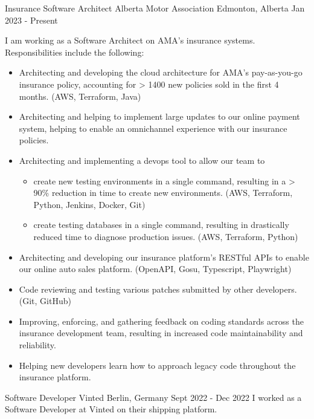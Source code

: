
\begin{cventries}
    \cventry
        {Insurance Software Architect}
        {Alberta Motor Association}
        {Edmonton, Alberta}
        {Jan 2023 - Present}
        {
            I am working as a Software Architect on AMA's insurance systems.  Responsibilities include the following:
            \begin{itemize}
                \item Architecting and developing the cloud architecture for AMA's pay-as-you-go insurance policy, accounting for > 1400 new policies sold in the first 4 months. (AWS, Terraform, Java)
                \item Architecting and helping to implement large updates to our online payment system, helping to enable an omnichannel experience with our insurance policies.
                \item Architecting and implementing a devops tool to allow our team to
                \begin{itemize}
                    \item create new testing environments in a single command, resulting in a > 90\% reduction in time to create new environments. (AWS, Terraform, Python, Jenkins, Docker, Git)
                    \item create testing databases in a single command, resulting in drastically reduced time to diagnose production issues. (AWS, Terraform, Python)
                \end{itemize}
                \item Architecting and developing our insurance platform's RESTful APIs to enable our online auto sales platform. (OpenAPI, Gosu, Typescript, Playwright)
                \item Code reviewing and testing various patches submitted by other developers. (Git, GitHub)
                \item Improving, enforcing, and gathering feedback on coding standards across the insurance development team, resulting in increased code maintainability and reliability.
                \item Helping new developers learn how to approach legacy code throughout the insurance platform.
            \end{itemize}
        }
    \cventry
        {Software Developer}
        {Vinted}
        {Berlin, Germany}
        {Sept 2022 - Dec 2022}
        {
            I worked as a Software Developer at Vinted on their shipping platform.
}
\end{cventries}
